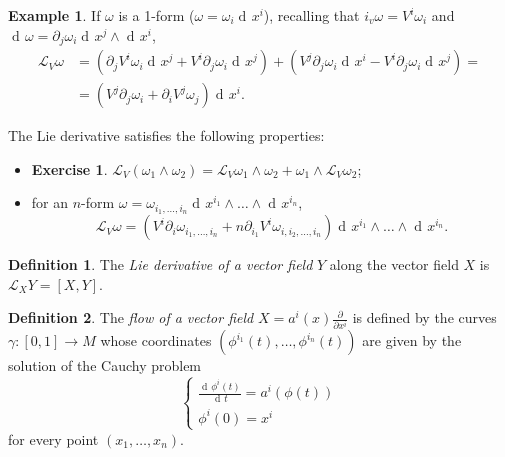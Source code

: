 \documentclass[a4paper,12pt]{book}
\newcommand{\dd}{\mathop{\mathrm{d}\!}{}}
\theoremstyle{definition}
\newtheorem{definition}{Definition}
\newtheorem{example}{Example}
\newtheorem{exercise}{Exercise}
\theoremstyle{remark}
\begin{document}
\begin{example}
If $\omega$ is a 1-form ($\omega=\omega_i\dd x^i$), recalling that $i_v\omega=V^i\omega_i$ and $\dd\omega=\partial_j\omega_i\dd x^j\wedge\dd x^i$,
\begin{align*}
\mathcal L_V\omega&=(\partial_jV^i\omega_i\dd x^j+V^i\partial_j\omega_i\dd x^j)+(V^j\partial_j\omega_i\dd x^i-V^i\partial_j\omega_i\dd x^j)=\\
&=(V^j\partial_j\omega_i+\partial_iV^j\omega_j)\dd x^i.\end{align*}
\end{example}

The Lie derivative satisfies the following properties:
\begin{itemize}
\item \leavevmode\par\vspace*{\dimexpr-4pt-\parskip-\baselineskip}
\begin{exercise}$\mathcal L_V(\omega_1\wedge\omega_2)=\mathcal L_V\omega_1\wedge\omega_2+\omega_1\wedge\mathcal L_V\omega_2$;\end{exercise}
\item for an $n$-form $\omega=\omega_{i_1,\ldots,i_n}\dd x^{i_1}\wedge\ldots\wedge\dd x^{i_n}$,
\[\mathcal L_V\omega=(V^i\partial_i\omega_{i_1,\ldots,i_n}+n\partial_{i_1}V^i\omega_{i,i_2,\ldots,i_n})\dd x^{i_1}\wedge\ldots\wedge\dd x^{i_n}.\]
\end{itemize}

\begin{definition}
The \emph{Lie derivative of a vector field} $Y$ along the vector field $X$ is $\mathcal L_XY=[X,Y]$.
\end{definition}

\begin{definition}
The \emph{flow of a vector field} $X=a^i(x)\frac{\partial}{\partial x^i}$ is defined by the curves $\gamma\colon[0,1]\to M$ whose coordinates $(\phi^{i_1}(t),\ldots,\phi^{i_n}(t))$ are given by the solution of the Cauchy problem
\[\begin{cases}
\frac{\dd \phi^i(t)}{\dd t}=a^i(\phi(t))\\
\phi^i(0)=x^i
\end{cases}\]
for every point $(x_1,\ldots,x_n)$.
\end{definition}
\end{document}
